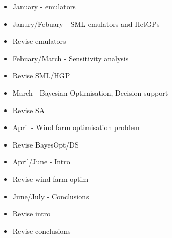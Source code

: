 \documentclass[12pt]{article}
\begin{document}
\begin{itemize}
	\item January - emulators
	\item Janury/Febuary - SML emulators and HetGPs
	\item Revise emulators
	\item Febuary/March - Sensitivity analysis
	\item Revise SML/HGP
	\item March - Bayesian Optimisation, Decision support
	\item Revise SA
	\item April - Wind farm optimisation problem
	\item Revise BayesOpt/DS
	\item April/June - Intro
	\item Revise wind farm optim
	\item June/July - Conclusions
	\item Revise intro
	\item Revise conclusions
\end{itemize}



\end{document}
